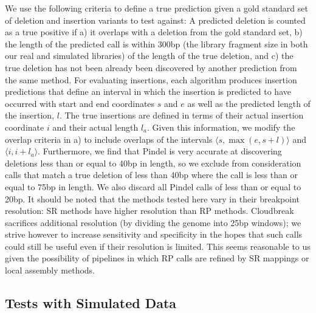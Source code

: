 \documentclass[11pt]{article}
\begin{document}
We use the following criteria to define a true prediction given a gold standard set of deletion and insertion variants to test against: A predicted deletion is counted as a true positive if a) it overlaps with a deletion from the gold standard set, b) the length of the predicted call is within 300bp (the library fragment size in both our real and simulated libraries) of the length of the true deletion, and c) the true deletion has not been already been discovered by another prediction from the same method. For evaluating insertions, each algorithm produces insertion predictions that define an interval in which the insertion is predicted to have occurred with start and end coordinates $s$ and $e$ as well as the predicted length of the insertion, $l$. The true insertions are defined in terms of their actual insertion coordinate $i$ and their actual length $l_a$. Given this information, we modify the overlap criteria in a) to include overlaps of the intervals $\langle s,\max{\left(e,s+l\right)} \rangle$ and $\langle i,i+l_a \rangle$. Furthermore, we find that Pindel is very accurate at discovering deletions less than or equal to 40bp in length, so we exclude from consideration calls that match a true deletion of less than 40bp where the call is less than or equal to 75bp in length. We also discard all Pindel calls of less than or equal to 20bp. It should be noted that the methods tested here vary in their breakpoint resolution: SR methods have higher resolution than RP methods. Cloudbreak sacrifices additional resolution (by dividing the genome into 25bp windows); we strive however to increase sensitivity and specificity in the hopes that such calls could still be useful even if their resolution is limited. This seems reasonable to us given the possibility of pipelines in which RP calls are refined by SR mappings or local assembly methods.

\subsection{Tests with Simulated Data}
\end{document}
